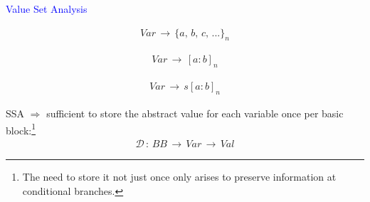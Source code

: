 \begin{frame}[fragile]{\textcolor{blue}{Value Set Analysis}}

\underline{}
\begin{align*}
Var \,\rightarrow\,\{a,\,b,\,c,\,...\}_n
\end{align*}

\underline{}
\begin{align*}
Var \,\rightarrow\, [a:b]_n
\end{align*}

\underline{}
\begin{align*}
Var \,\rightarrow\,s[a:b]_n
\end{align*}

\vspace{1.5cm}

SSA $\Rightarrow$ sufficient to store the {\color{blue}abstract value for each variable once per basic block}:\footnote{The need to store it not just once only arises to preserve information at conditional branches.}
\begin{align*}
\mathcal{D}\,:\, BB \,\rightarrow\, Var \, \rightarrow\, Val
\end{align*}

\end{frame}

